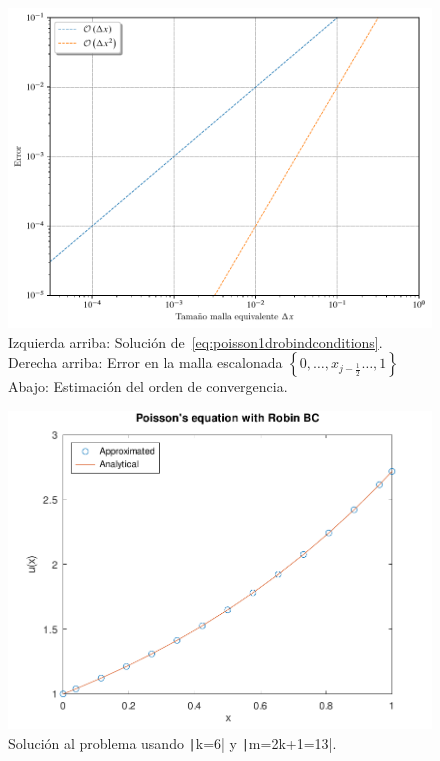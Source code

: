 \begin{problem}
\begin{figure}[ht!]
    \includegraphics[width=.6\paperwidth]{elliptic1Dconvergenceorder.pdf}
    \caption{Izquierda arriba: Solución de~\eqref{eq:poisson1drobindconditions}.
        Derecha arriba: Error en la malla escalonada
        \begin{math}
            \left\{
            0,
            \dotsc,
            x_{j-\frac{1}{2}}
            \dotsc,
            1
            \right\}
        \end{math}
        Abajo: Estimación del orden de convergencia.}
\end{figure}

\begin{figure}[ht!]
    \centering
    \includegraphics[width=.6\paperwidth]{../examples/octave/elliptic1D.pdf}
    \caption{Solución al problema usando \texttt|k=6| y \texttt|m=2k+1=13|.}
\end{figure}

\noQED %
\end{problem}

